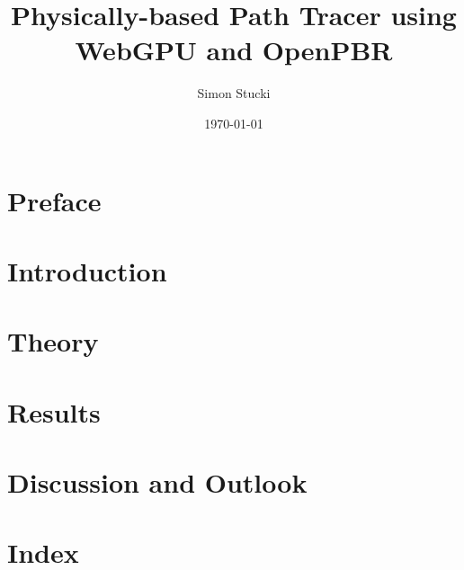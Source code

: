 \documentclass[a4paper, 11pt,abstract=on, listof=totocnumbered]{scrreprt}
\title{Physically-based Path Tracer using WebGPU and OpenPBR}
\author{Simon Stucki}
\date{\today}
\begin{document}


\clearpage
\setcounter{page}{1}


\begin{abstract}
  
\end{abstract}

\chapter*{Preface}


\renewcommand{\contentsname}{Contents}
\tableofcontents

\chapter{Introduction}


\chapter{Theory}


\chapter{Results}


\chapter{Discussion and Outlook}


\chapter{Index}


%
\end{document}
